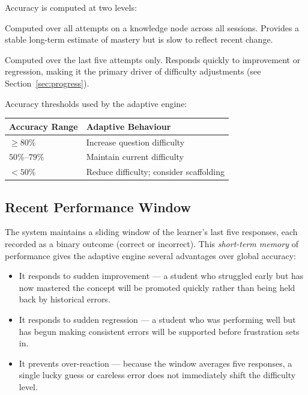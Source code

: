 \documentclass[12pt,a4paper]{article}
\begin{document}
Accuracy is computed at two levels:

\begin{description}[leftmargin=2em, style=nextline]
  \item[\textbf{Global accuracy}]
    Computed over all attempts on a knowledge node across all sessions.
    Provides a stable long-term estimate of mastery but is slow to reflect
    recent change.

  \item[\textbf{Recent accuracy}]
    Computed over the last five attempts only.  Responds quickly to
    improvement or regression, making it the primary driver of difficulty
    adjustments (see Section~\ref{sec:progress}).
\end{description}

Accuracy thresholds used by the adaptive engine:

\begin{center}
\begin{tabular}{ll}
  \toprule
  \textbf{Accuracy Range} & \textbf{Adaptive Behaviour} \\
  \midrule
  $\geq 80\%$ & Increase question difficulty \\
  $50\%$–$79\%$ & Maintain current difficulty \\
  $< 50\%$ & Reduce difficulty; consider scaffolding \\
  \bottomrule
\end{tabular}
\end{center}

\subsection{Recent Performance Window}

The system maintains a sliding window of the learner's last five responses,
each recorded as a binary outcome (correct or incorrect).  This
\emph{short-term memory} of performance gives the adaptive engine several
advantages over global accuracy:

\begin{itemize}[leftmargin=1.8em]
  \item It responds to sudden improvement — a student who struggled early but
        has now mastered the concept will be promoted quickly rather than being
        held back by historical errors.
  \item It responds to sudden regression — a student who was performing well
        but has begun making consistent errors will be supported before
        frustration sets in.
  \item It prevents over-reaction — because the window averages five responses,
        a single lucky guess or careless error does not immediately shift the
        difficulty level.
\end{itemize}
\end{document}

